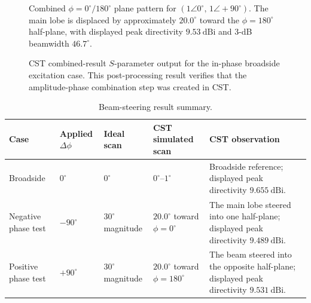 \begin{figure}[H]
    \centering
    \caption[Steered pattern for a \(+90^\circ\) phase shift.]{Combined \(\phi=0^\circ/180^\circ\) plane pattern for \((1\angle0^\circ,\,1\angle+90^\circ)\). The main lobe is displaced by approximately \(20.0^\circ\) toward the \(\phi=180^\circ\) half-plane, with displayed peak directivity \(9.53~\mathrm{dBi}\) and 3-dB beamwidth \(46.7^\circ\).}
    \label{fig:array-plus90-phi0}
\end{figure}

\begin{figure}[H]
    \centering
    \caption{CST combined-result \(S\)-parameter output for the in-phase broadside excitation case. This post-processing result verifies that the amplitude-phase combination step was created in CST.}
    \label{fig:array-combined-sparam}
\end{figure}

\begin{table}[H]
\centering
\caption{Beam-steering result summary.}
\label{tab:beamsteering-results-summary}
\footnotesize
\setlength{\tabcolsep}{3.5pt}
\renewcommand{\arraystretch}{1.25}
\begin{tabularx}{\textwidth}{@{}
>{\raggedright\arraybackslash}p{}
>{\centering\arraybackslash}p{}
>{\centering\arraybackslash}p{}
>{\centering\arraybackslash}p{}
>{\raggedright\arraybackslash}X
@{}}
\toprule
\textbf{Case} &
\textbf{Applied \(\Delta\phi\)} &
\textbf{Ideal scan} &
\textbf{CST simulated scan} &
\textbf{CST observation} \\
\midrule
Broadside &
\(0^\circ\) &
\(0^\circ\) &
\(0^\circ\)--\(1^\circ\) &
Broadside reference; displayed peak directivity \(9.655~\mathrm{dBi}\). \\
Negative phase test &
\(-90^\circ\) &
\(30^\circ\) magnitude &
\(20.0^\circ\) toward \(\phi=0^\circ\) &
The main lobe steered into one half-plane; displayed peak directivity \(9.489~\mathrm{dBi}\). \\
Positive phase test &
\(+90^\circ\) &
\(30^\circ\) magnitude &
\(20.0^\circ\) toward \(\phi=180^\circ\) &
The beam steered into the opposite half-plane; displayed peak directivity \(9.531~\mathrm{dBi}\). \\
\bottomrule
\end{tabularx}
\end{table}
